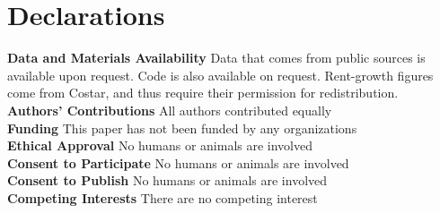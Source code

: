 \documentclass[pdflatex,sn-apa]{sn-jnl}%
\theoremstyle{thmstyleone}%
\theoremstyle{thmstyletwo}%
\theoremstyle{thmstylethree}%
\begin{document}
\section*{Declarations}
\textbf{Data and Materials Availability} Data that comes from public sources is available upon request. Code is also available on request. Rent-growth figures come from Costar, and thus require their permission for redistribution.\\
\textbf{Authors' Contributions} All authors contributed equally\\
\textbf{Funding} This paper has not been funded by any organizations\\
\textbf{Ethical Approval} No humans or animals are involved\\
\textbf{Consent to Participate} No humans or animals are involved\\
\textbf{Consent to Publish}  No humans or animals are involved\\
\textbf{Competing Interests} There are no competing interest\\
\newpage
\clearpage
\end{document}
